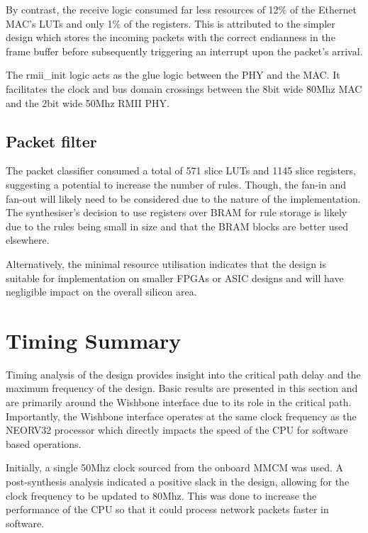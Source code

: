 By contrast, the receive logic consumed far less resources of 12\% of the Ethernet MAC's LUTs and only 1\% of the registers. This is attributed to the simpler design which stores the incoming packets with the correct endianness in the frame buffer before subsequently triggering an interrupt upon the packet's arrival. 

The rmii\_init logic acts as the glue logic between the PHY and the MAC. It facilitates the clock and bus domain crossings between the 8bit wide 80Mhz MAC and the 2bit wide 50Mhz RMII PHY. 



\subsection{Packet filter}

The packet classifier consumed a total of 571 slice LUTs and 1145 slice registers, suggesting a potential to increase the number of rules. Though, the fan-in and fan-out will likely need to be considered due to the nature of the implementation. The synthesiser's decision to use registers over BRAM for rule storage is likely due to the rules being small in size and that the BRAM blocks are better used elsewhere.

Alternatively, the minimal resource utilisation indicates that the design is suitable for implementation on smaller FPGAs or ASIC designs and will have negligible impact on the overall silicon area.





\section{Timing Summary}
\label{sec:timing_summary}


Timing analysis of the design provides insight into the critical path delay and the maximum frequency of the design. Basic results are presented in this section and are primarily around the Wishbone interface due to its role in the critical path. Importantly, the Wishbone interface operates at the same clock frequency as the NEORV32 processor which directly impacts the speed of the CPU for software based operations.

Initially, a single 50Mhz clock sourced from the onboard MMCM was used. A post-synthesis analysis indicated a positive slack in the design, allowing for the clock frequency to be updated to 80Mhz. This was done to increase the performance of the CPU so that it could process network packets faster in software.

